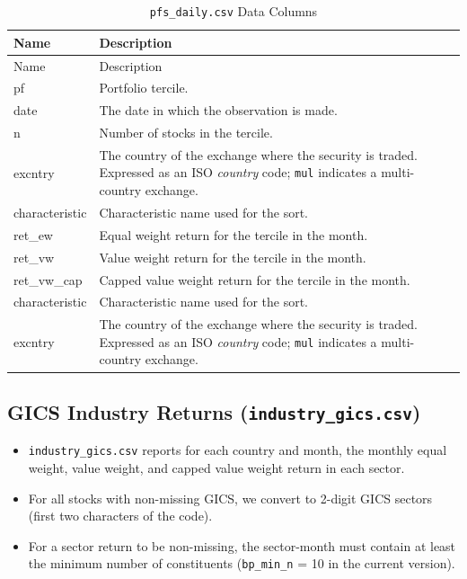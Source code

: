 \documentclass[12pt,title,fleqn]{article}
\begin{document}
{\scriptsize
	\begin{longtable}{@{\extracolsep{\fill}}|l|m{14.2cm}|@{}}
	\caption{\texttt{pfs\_daily.csv} Data Columns \label{pfs}}\\
	
	\hline
	Name & Description \\
	\hline
	\endfirsthead
	
	\hline
	Name & Description \\
	\hline
	\endhead
	
	\hline
	\endfoot
	
	
	\hline\hline
	\endlastfoot
	pf\rule{0pt}{10pt} & Portfolio tercile. \\[1ex]

    date & The date in which the observation is made. \\[1ex]

    n & Number of stocks in the tercile. \\[1ex]

	excntry & The country of the exchange where the security is traded. Expressed as an ISO \emph{country} code; \texttt{mul} indicates a multi\hyp country exchange. \\[1ex]
	
	characteristic & Characteristic name used for the sort. \\[1ex]
    
	ret\_ew & Equal weight return for the tercile in the month.\\[1ex]

	ret\_vw & Value weight return for the tercile in the month.\\[1ex]

	ret\_vw\_cap & Capped value weight return for the tercile in the month.\\[1ex]

	characteristic & Characteristic name used for the sort. \\[1ex]
    
	excntry & The country of the exchange where the security is traded. Expressed as an ISO \emph{country} code; \texttt{mul} indicates a multi\hyp country exchange. \\[1ex]
	
\end{longtable}}


\subsection{GICS Industry Returns (\texttt{industry\_gics.csv})}
\begin{itemize}
    \item \texttt{industry\_gics.csv} reports for each country and month, the monthly equal weight, value weight, and capped value weight return in each sector.
    \item For all stocks with non-missing GICS, we convert to 2-digit GICS sectors (first two characters of the code).
    \item For a sector return to be non-missing, the sector-month must contain at least the minimum number of constituents (\texttt{bp\_min\_n} = 10 in the current version).

\end{itemize}
\end{document}
